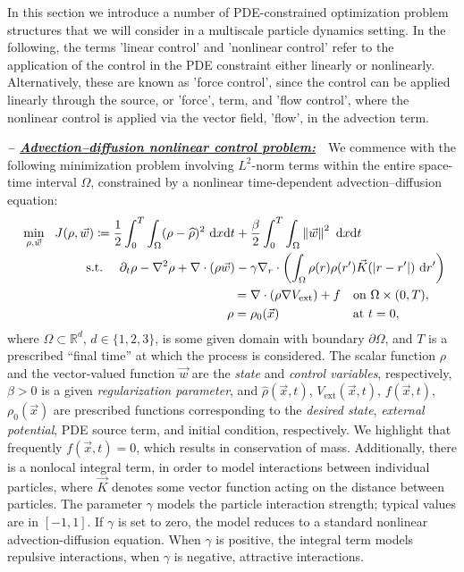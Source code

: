 In this section we introduce a number of PDE-constrained optimization problem structures that we will consider in a multiscale particle dynamics setting. In the following, the terms 'linear control' and 'nonlinear control' refer to the application of the control in the PDE constraint either linearly or nonlinearly. Alternatively, these are known as 'force control', since the control can be applied linearly through the source, or 'force', term, and 'flow control', where the nonlinear control is applied via the vector field, 'flow', in the advection term. 
\vspace{0.75em}

\textbf{\emph{-- \underline{Advection--diffusion nonlinear control problem:}}}~~We commence with the following minimization problem involving $L^2$-norm terms within the entire space-time interval $\Omega$, constrained by a nonlinear time-dependent advection--diffusion equation:
\begin{align}
\ \label{AdvDiff} \min_{\rho,\vec{w}}~~J(\rho, \vec{w}) \coloneqq  \frac{1}{2}\int_0^T\int_{\Omega}(\rho-\widehat{\rho})^2~{\rm d}x{\rm d}t+{}&\frac{\beta}{2}\int_0^T\int_{\Omega}\left\|\vec{w}\right\|^2~{\rm d}x{\rm d}t \\
\ \nonumber \text{s.t.}\quad~\partial_{t}\rho-\nabla^{2}\rho+\nabla\cdot(\rho\vec{w})-{}&\gamma\nabla_{r}\cdot\left(\int_{\Omega}\rho(r)\rho(r')\vec{K}(|r-r'|)~{\rm d}r'\right)\\
\nonumber
={}&\nabla\cdot(\rho\nabla{}V_{\text{ext}})+f\quad\text{on }\Omega\times(0,T), \\
\ \nonumber \rho={}&\rho_{0}(\vec{x})\quad\hspace{4.9em}\text{at }t=0,
\end{align}
where $\Omega\subset\mathbb{R}^{d}$, $d\in\{1,2,3\}$, is some given domain with boundary $\partial\Omega$, and $T$ is a prescribed ``final time'' at which the process is considered. The scalar function $\rho$ and the vector-valued function $\vec{w}$ are the \emph{state} and \emph{control variables}, respectively, $\beta>0$ is a given \emph{regularization parameter}, and $\widehat{\rho}(\vec{x},t)$, $V_{\text{ext}}(\vec{x},t)$, $f(\vec{x},t)$, $\rho_{0}(\vec{x})$ are prescribed functions corresponding to the \emph{desired state}, \emph{external potential}, PDE source term, and initial condition, respectively. We highlight that frequently $f(\vec{x},t)=0$,
which results in conservation of mass.
Additionally, there is a nonlocal integral term, in order to model interactions between individual particles, where $\vec{K}$ denotes some vector function acting on the distance between particles. The parameter $\gamma$ models the particle interaction strength; typical values are in $[-1,1]$. If $\gamma$ is set to zero, the model reduces to a standard nonlinear advection-diffusion equation. When $\gamma$ is positive, the integral term models repulsive interactions, when $\gamma$ is negative, attractive interactions. 


